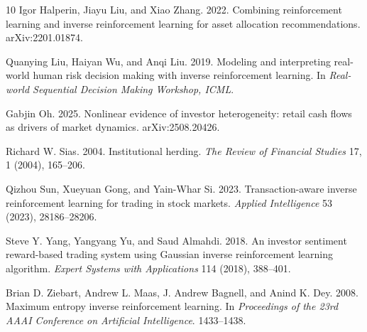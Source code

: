 \documentclass[sigconf,anonymous,review]{acmart}
\begin{document}
\begin{thebibliography}{10}
Igor Halperin, Jiayu Liu, and Xiao Zhang. 2022.
\newblock Combining reinforcement learning and inverse reinforcement
  learning for asset allocation recommendations.
\newblock arXiv:2201.01874.

Quanying Liu, Haiyan Wu, and Anqi Liu. 2019.
\newblock Modeling and interpreting real-world human risk decision making
  with inverse reinforcement learning.
\newblock In \emph{Real-world Sequential Decision Making Workshop, ICML}.

Gabjin Oh. 2025.
\newblock Nonlinear evidence of investor heterogeneity: retail cash flows
  as drivers of market dynamics.
\newblock arXiv:2508.20426.

Richard W. Sias. 2004.
\newblock Institutional herding.
\newblock \emph{The Review of Financial Studies} 17, 1 (2004), 165--206.

Qizhou Sun, Xueyuan Gong, and Yain-Whar Si. 2023.
\newblock Transaction-aware inverse reinforcement learning for trading in
  stock markets.
\newblock \emph{Applied Intelligence} 53 (2023), 28186--28206.

Steve Y. Yang, Yangyang Yu, and Saud Almahdi. 2018.
\newblock An investor sentiment reward-based trading system using
  Gaussian inverse reinforcement learning algorithm.
\newblock \emph{Expert Systems with Applications} 114 (2018), 388--401.

Brian D. Ziebart, Andrew L. Maas, J. Andrew Bagnell, and Anind K. Dey. 2008.
\newblock Maximum entropy inverse reinforcement learning.
\newblock In \emph{Proceedings of the 23rd AAAI Conference on Artificial
  Intelligence}. 1433--1438.


\end{thebibliography}
\end{document}
